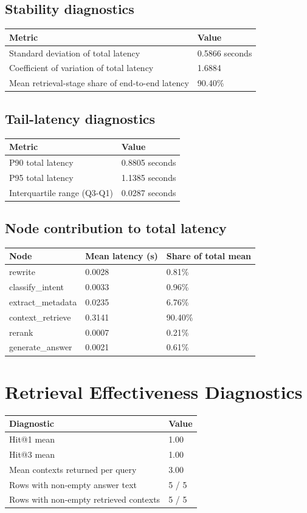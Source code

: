 \documentclass[12pt,a4paper]{article}
\begin{document}
\subsection*{Stability diagnostics}
\begin{longtable}{@{}p{} p{}@{}}
\toprule
Metric & Value \\
\midrule
Standard deviation of total latency & 0.5866 seconds \\
Coefficient of variation of total latency & 1.6884 \\
Mean retrieval-stage share of end-to-end latency & 90.40\% \\
\bottomrule
\end{longtable}

\subsection*{Tail-latency diagnostics}
\begin{longtable}{@{}p{} p{}@{}}
\toprule
Metric & Value \\
\midrule
P90 total latency & 0.8805 seconds \\
P95 total latency & 1.1385 seconds \\
Interquartile range (Q3-Q1) & 0.0287 seconds \\
\bottomrule
\end{longtable}

\subsection*{Node contribution to total latency}
\begin{longtable}{@{}p{} p{} p{}@{}}
\toprule
Node & Mean latency (s) & Share of total mean \\
\midrule
rewrite & 0.0028 & 0.81\% \\
classify\_intent & 0.0033 & 0.96\% \\
extract\_metadata & 0.0235 & 6.76\% \\
context\_retrieve & 0.3141 & 90.40\% \\
rerank & 0.0007 & 0.21\% \\
generate\_answer & 0.0021 & 0.61\% \\
\bottomrule
\end{longtable}

\section{Retrieval Effectiveness Diagnostics}
\begin{longtable}{@{}p{} p{}@{}}
\toprule
Diagnostic & Value \\
\midrule
Hit@1 mean & 1.00 \\
Hit@3 mean & 1.00 \\
Mean contexts returned per query & 3.00 \\
Rows with non-empty answer text & 5 / 5 \\
Rows with non-empty retrieved contexts & 5 / 5 \\
\bottomrule
\end{longtable}
\end{document}
